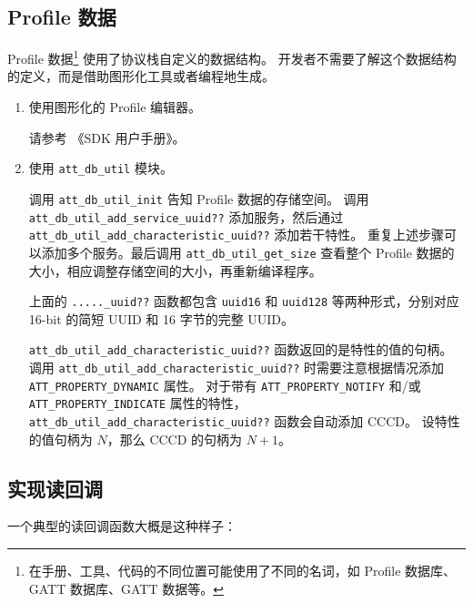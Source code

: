 \documentclass[
  12pt,
]{book}
\begin{document}
\hypertarget{profile-ux6570ux636e}{%
\subsection{Profile 数据}\label{profile-ux6570ux636e}}

Profile 数据\footnote{在手册、工具、代码的不同位置可能使用了不同的名词，如 Profile 数据库、GATT 数据库、GATT 数据等。} 使用了协议栈自定义的数据结构。
开发者不需要了解这个数据结构的定义，而是借助图形化工具或者编程地生成。

\begin{enumerate}
\def\labelenumi{\arabic{enumi}.}
\item
  使用图形化的 Profile 编辑器。

  请参考 《SDK 用户手册》。
\item
  使用 \texttt{att\_db\_util} 模块。

  调用 \texttt{att\_db\_util\_init} 告知 Profile 数据的存储空间。
  调用 \texttt{att\_db\_util\_add\_service\_uuid??} 添加服务，然后通过 \texttt{att\_db\_util\_add\_characteristic\_uuid??} 添加若干特性。
  重复上述步骤可以添加多个服务。最后调用 \texttt{att\_db\_util\_get\_size} 查看整个 Profile 数据的大小，相应调整存储空间的大小，再重新编译程序。

  上面的 \texttt{.....\_uuid??} 函数都包含 \texttt{uuid16} 和 \texttt{uuid128} 等两种形式，分别对应 16-bit 的简短 UUID 和 16 字节的完整 UUID。

  \texttt{att\_db\_util\_add\_characteristic\_uuid??} 函数返回的是特性的值的句柄。
  调用 \texttt{att\_db\_util\_add\_characteristic\_uuid??} 时需要注意根据情况添加 \texttt{ATT\_PROPERTY\_DYNAMIC} 属性。
  对于带有 \texttt{ATT\_PROPERTY\_NOTIFY} 和/或 \texttt{ATT\_PROPERTY\_INDICATE} 属性的特性，\texttt{att\_db\_util\_add\_characteristic\_uuid??} 函数会自动添加 CCCD。
  设特性的值句柄为 \(N\)，那么 CCCD 的句柄为 \(N + 1\)。
\end{enumerate}

\hypertarget{ux5b9eux73b0ux8bfbux56deux8c03}{%
\subsection{实现读回调}\label{ux5b9eux73b0ux8bfbux56deux8c03}}

一个典型的读回调函数大概是这种样子：
\end{document}
